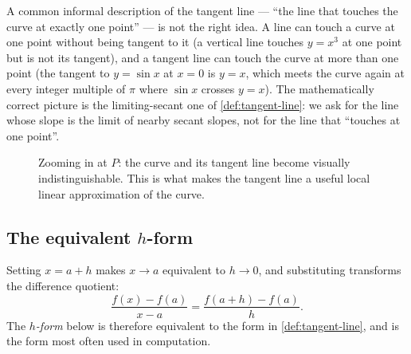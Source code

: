 \begin{caution}
A common informal description of the tangent line --- ``the line that touches the curve at exactly one point'' --- is not the right idea. A line can touch a curve at one point without being tangent to it (a vertical line touches \(y = x^{3}\) at one point but is not its tangent), and a tangent line can touch the curve at more than one point (the tangent to \(y = \sin x\) at \(x = 0\) is \(y = x\), which meets the curve again at every integer multiple of \(\pi\) where \(\sin x\) crosses \(y = x\)). The mathematically correct picture is the limiting-secant one of \cref{def:tangent-line}: we ask for the line whose slope is the limit of nearby secant slopes, not for the line that ``touches at one point''.
\end{caution}

\begin{figure}[H]
\centering
{}
\caption{Zooming in at \(P\): the curve and its tangent line become visually indistinguishable. This is what makes the tangent line a useful local linear approximation of the curve.}
\label{fig:tangent-zoom}
\end{figure}

\subsection{The equivalent \texorpdfstring{$h$}{h}-form}

Setting \(x = a + h\) makes \(x \to a\) equivalent to \(h \to 0\), and substituting transforms the difference quotient:
\[
\frac{f(x) - f(a)}{x - a} = \frac{f(a + h) - f(a)}{h}.
\]
The \emph{\(h\)-form} below is therefore equivalent to the form in \cref{def:tangent-line}, and is the form most often used in computation.

